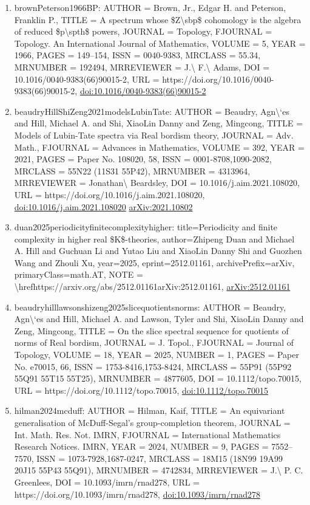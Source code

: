 \documentclass[11pt]{article}
\begin{document}
\begin{enumerate}[leftmargin=*]
  \item brownPeterson1966BP: AUTHOR = Brown, Jr., Edgar H. and Peterson, Franklin P., TITLE = A spectrum whose \$Z\textbackslash{}sbp\$ cohomology is the algebra of reduced \$p\textbackslash{}spth\$ powers, JOURNAL = Topology, FJOURNAL = Topology. An International Journal of Mathematics, VOLUME = 5, YEAR = 1966, PAGES = 149--154, ISSN = 0040-9383, MRCLASS = 55.34, MRNUMBER = 192494, MRREVIEWER = J.\textbackslash{} F.\textbackslash{} Adams, DOI = 10.1016/0040-9383(66)90015-2, URL = https://doi.org/10.1016/0040-9383(66)90015-2, \href{https://doi.org/10.1016/0040-9383(66)90015-2}{doi:10.1016/0040-9383(66)90015-2}
  \item beaudryHillShiZeng2021modelsLubinTate: AUTHOR = Beaudry, Agn\textbackslash{}`es and Hill, Michael A. and Shi, XiaoLin Danny and Zeng, Mingcong, TITLE = Models of Lubin-Tate spectra via Real bordism theory, JOURNAL = Adv. Math., FJOURNAL = Advances in Mathematics, VOLUME = 392, YEAR = 2021, PAGES = Paper No. 108020, 58, ISSN = 0001-8708,1090-2082, MRCLASS = 55N22 (11S31 55P42), MRNUMBER = 4313964, MRREVIEWER = Jonathan\textbackslash{} Beardsley, DOI = 10.1016/j.aim.2021.108020, URL = https://doi.org/10.1016/j.aim.2021.108020, \href{https://doi.org/10.1016/j.aim.2021.108020}{doi:10.1016/j.aim.2021.108020} \href{https://arxiv.org/abs/2021.10802}{arXiv:2021.10802}
  \item duan2025periodicityfinitecomplexityhigher: title=Periodicity and finite complexity in higher real \$K\$-theories, author=Zhipeng Duan and Michael A. Hill and Guchuan Li and Yutao Liu and XiaoLin Danny Shi and Guozhen Wang and Zhouli Xu, year=2025, eprint=2512.01161, archivePrefix=arXiv, primaryClass=math.AT, NOTE = \textbackslash{}hrefhttps://arxiv.org/abs/2512.01161arXiv:2512.01161, \href{https://arxiv.org/abs/2512.01161}{arXiv:2512.01161}
  \item beaudryhilllawsonshizeng2025slicequotientsnorms: AUTHOR = Beaudry, Agn\textbackslash{}`es and Hill, Michael A. and Lawson, Tyler and Shi, XiaoLin Danny and Zeng, Mingcong, TITLE = On the slice spectral sequence for quotients of norms of Real bordism, JOURNAL = J. Topol., FJOURNAL = Journal of Topology, VOLUME = 18, YEAR = 2025, NUMBER = 1, PAGES = Paper No. e70015, 66, ISSN = 1753-8416,1753-8424, MRCLASS = 55P91 (55P92 55Q91 55T15 55T25), MRNUMBER = 4877605, DOI = 10.1112/topo.70015, URL = https://doi.org/10.1112/topo.70015, \href{https://doi.org/10.1112/topo.70015}{doi:10.1112/topo.70015}
  \item hilman2024mcduff: AUTHOR = Hilman, Kaif, TITLE = An equivariant generalisation of McDuff-Segal's group-completion theorem, JOURNAL = Int. Math. Res. Not. IMRN, FJOURNAL = International Mathematics Research Notices. IMRN, YEAR = 2024, NUMBER = 9, PAGES = 7552--7570, ISSN = 1073-7928,1687-0247, MRCLASS = 18M15 (18N99 19A99 20J15 55P43 55Q91), MRNUMBER = 4742834, MRREVIEWER = J.\textbackslash{} P. C. Greenlees, DOI = 10.1093/imrn/rnad278, URL = https://doi.org/10.1093/imrn/rnad278, \href{https://doi.org/10.1093/imrn/rnad278}{doi:10.1093/imrn/rnad278}

\end{enumerate}
\end{document}
